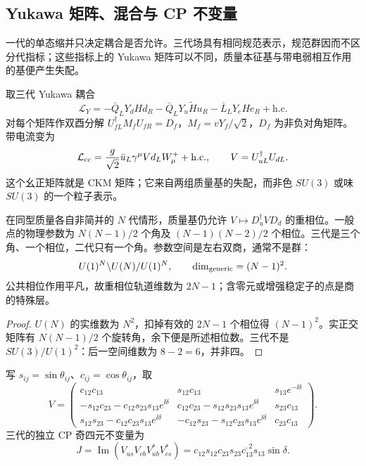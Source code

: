 \subsection{Yukawa 矩阵、混合与 CP 不变量}

一代的单态缩并只决定耦合是否允许。三代场具有相同规范表示，规范群因而不区分代指标；这些指标上的 Yukawa 矩阵可以不同，质量本征基与带电弱相互作用的基便产生失配。

\begin{definition}
取三代 Yukawa 耦合
\[
 \mathcal L_Y=-\bar Q_LY_dHd_R-\bar Q_LY_u\widetilde H u_R-\bar L_LY_eHe_R+\mathrm{h.c.}
\]
对每个矩阵作双酉分解 $U_{fL}^\dagger M_fU_{fR}=D_f$，$M_f=vY_f/\sqrt2$，$D_f$ 为非负对角矩阵。带电流变为
\[
 \mathcal L_{\rm cc}=\frac g{\sqrt2}\bar u_L\gamma^\mu Vd_LW_\mu^++\mathrm{h.c.},\qquad
 V=U_{uL}^\dagger U_{dL}.
\]
这个幺正矩阵就是 CKM 矩阵；它来自两组质量基的失配，而非色 $SU(3)$ 或味 $SU(3)$ 的一个粒子表示。
\end{definition}

\begin{proposition}[混合参数的计数]
在同型质量各自非简并的 $N$ 代情形，质量基仍允许 $V\mapsto D_u^\dagger VD_d$ 的重相位。一般点的物理参数为 $N(N-1)/2$ 个角及 $(N-1)(N-2)/2$ 个相位。三代是三个角、一个相位，二代只有一个角。参数空间是左右双商，通常不是群：
\begin{equation}
 U(1)^N\backslash U(N)/U(1)^N,
 \qquad \dim_{\rm generic}=(N-1)^2.
 \label{eq:ckm-space}
\end{equation}
公共相位作用平凡，故重相位轨道维数为 $2N-1$；含零元或增强稳定子的点是商的特殊层。
\end{proposition}
\begin{proof}
$U(N)$ 的实维数为 $N^2$，扣掉有效的 $2N-1$ 个相位得 $(N-1)^2$。实正交矩阵有 $N(N-1)/2$ 个旋转角，余下便是所述相位数。三代不是 $SU(3)/U(1)^2$：后一空间维数为 $8-2=6$，并非四。
\end{proof}

\begin{definition}
写 $s_{ij}=\sin\theta_{ij}$、$c_{ij}=\cos\theta_{ij}$，取
\[
 V=\begin{pmatrix}
 c_{12}c_{13}&s_{12}c_{13}&s_{13}e^{-\ii\delta}\\
 -s_{12}c_{23}-c_{12}s_{23}s_{13}e^{\ii\delta}&c_{12}c_{23}-s_{12}s_{23}s_{13}e^{\ii\delta}&s_{23}c_{13}\\
 s_{12}s_{23}-c_{12}c_{23}s_{13}e^{\ii\delta}&-c_{12}s_{23}-s_{12}c_{23}s_{13}e^{\ii\delta}&c_{23}c_{13}
 \end{pmatrix}.
\]
三代的独立 CP 奇四元不变量为
\begin{equation}
 J=\operatorname{Im}(V_{us}V_{cb}V_{ub}^*V_{cs}^*)
 =c_{12}s_{12}c_{23}s_{23}c_{13}^{,2}s_{13}\sin\delta.
 \label{eq:jarlskog}
\end{equation}
\end{definition}


